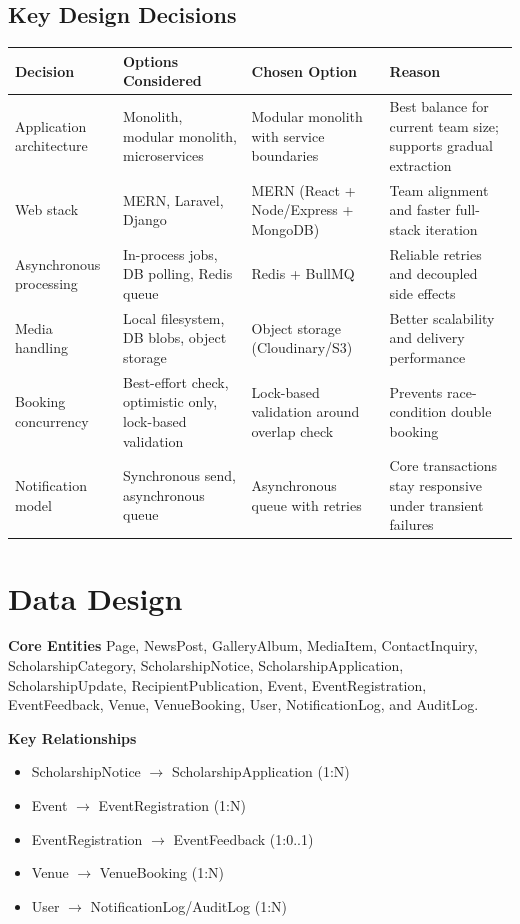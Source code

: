 \documentclass[12pt,a4paper]{article}
\newcommand{\thead}[1]{\textbf{\color{white}#1}}
\newcommand{\theadrow}{\rowcolor{headerblue}}
\begin{document}
\subsection{Key Design Decisions}
\begin{longtable}{@{}L{3.0cm}L{4.1cm}L{3.3cm}L{4.8cm}@{}}
\theadrow \thead{Decision} & \thead{Options Considered} & \thead{Chosen Option} & \thead{Reason} \\
\endhead
Application architecture & Monolith, modular monolith, microservices & Modular monolith with service boundaries & Best balance for current team size; supports gradual extraction \\
Web stack & MERN, Laravel, Django & MERN (React + Node/Express + MongoDB) & Team alignment and faster full-stack iteration \\
Asynchronous processing & In-process jobs, DB polling, Redis queue & Redis + BullMQ & Reliable retries and decoupled side effects \\
Media handling & Local filesystem, DB blobs, object storage & Object storage (Cloudinary/S3) & Better scalability and delivery performance \\
Booking concurrency & Best-effort check, optimistic only, lock-based validation & Lock-based validation around overlap check & Prevents race-condition double booking \\
Notification model & Synchronous send, asynchronous queue & Asynchronous queue with retries & Core transactions stay responsive under transient failures \\
\bottomrule
\end{longtable}

\section{Data Design}

\textbf{Core Entities}
Page, NewsPost, GalleryAlbum, MediaItem, ContactInquiry, ScholarshipCategory, ScholarshipNotice, ScholarshipApplication, ScholarshipUpdate, RecipientPublication, Event, EventRegistration, EventFeedback, Venue, VenueBooking, User, NotificationLog, and AuditLog.

\textbf{Key Relationships}
\begin{itemize}[nosep]
\item ScholarshipNotice $\rightarrow$ ScholarshipApplication (1:N)
\item Event $\rightarrow$ EventRegistration (1:N)
\item EventRegistration $\rightarrow$ EventFeedback (1:0..1)
\item Venue $\rightarrow$ VenueBooking (1:N)
\item User $\rightarrow$ NotificationLog/AuditLog (1:N)
\end{itemize}
\end{document}
